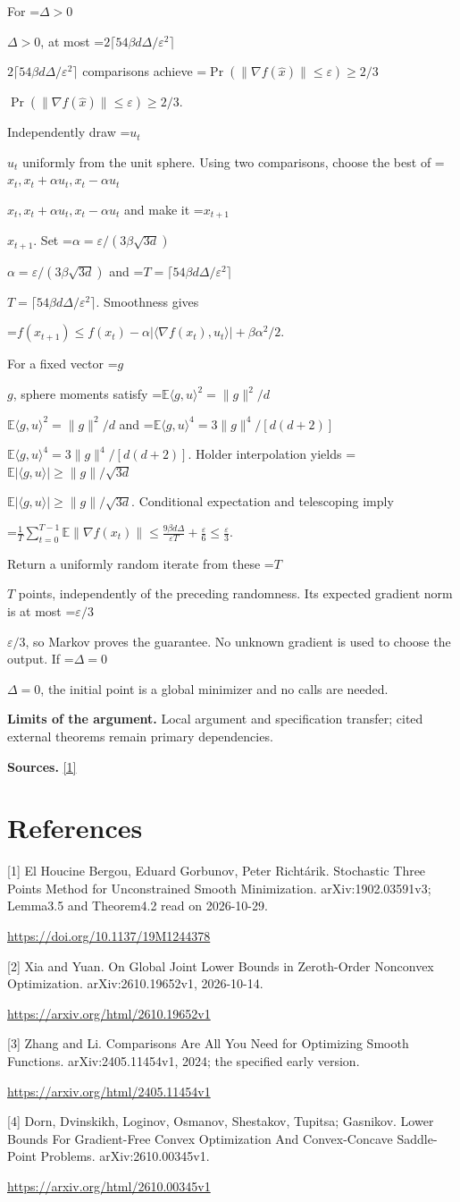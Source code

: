 \documentclass[10pt,a4paper]{article}
\newcommand{\AtlasMath}[1]{\par\begingroup\centering\setbox0=\hbox{$\displaystyle #1$}\ifdim\wd0>1.4\linewidth\typeout{ATLAS WIDE FORMULA: \the\wd0}\fi\ifdim\wd0>\linewidth\resizebox{\linewidth}{!}{\box0}\else\box0\fi\par\endgroup}
\newcommand{\AtlasInlineMath}[1]{\begingroup\setbox0=\hbox{$#1$}\ifdim\wd0>.4\linewidth\endgroup\AtlasMath{#1}\else\endgroup$#1$\fi}
\begin{document}
For \AtlasInlineMath{\Delta>0}, at most \AtlasInlineMath{2\lceil54\beta d\Delta/\varepsilon^2\rceil} comparisons achieve \AtlasInlineMath{\Pr(\|\nabla f(\widehat x)\|\le\varepsilon)\ge2/3}.

Independently draw \AtlasInlineMath{u_t} uniformly from the unit sphere. Using two comparisons, choose the best of \AtlasInlineMath{x_t,x_t+\alpha u_t,x_t-\alpha u_t} and make it \AtlasInlineMath{x_{t+1}}. Set \AtlasInlineMath{\alpha=\varepsilon/(3\beta\sqrt{3d})} and \AtlasInlineMath{T=\lceil54\beta d\Delta/\varepsilon^2\rceil}. Smoothness gives

\AtlasMath{f(x_{t+1})\le f(x_t)-\alpha|\langle\nabla f(x_t),u_t\rangle|+\beta\alpha^2/2.}

For a fixed vector \AtlasInlineMath{g}, sphere moments satisfy \AtlasInlineMath{\mathbb E\langle g,u\rangle^2=\|g\|^2/d} and \AtlasInlineMath{\mathbb E\langle g,u\rangle^4=3\|g\|^4/[d(d+2)]}. Holder interpolation yields \AtlasInlineMath{\mathbb E|\langle g,u\rangle|\ge\|g\|/\sqrt{3d}}. Conditional expectation and telescoping imply

\AtlasMath{\frac1T\sum_{t=0}^{T-1}\mathbb E\|\nabla f(x_t)\|\le\frac{9\beta d\Delta}{\varepsilon T}+\frac\varepsilon6\le\frac\varepsilon3.}

Return a uniformly random iterate from these \AtlasInlineMath{T} points, independently of the preceding randomness. Its expected gradient norm is at most \AtlasInlineMath{\varepsilon/3}, so Markov proves the guarantee. No unknown gradient is used to choose the output. If \AtlasInlineMath{\Delta=0}, the initial point is a global minimizer and no calls are needed.

\textbf{Limits of the argument.} Local argument and specification transfer; cited external theorems remain primary dependencies.

\textbf{Sources.} \href{https://doi.org/10.1137/19M1244378}{[1]}

\section{References}
[1] El Houcine Bergou, Eduard Gorbunov, Peter Richtárik. Stochastic Three Points Method for Unconstrained Smooth Minimization. arXiv:1902.03591v3; Lemma3.5 and Theorem4.2 read on 2026-10-29.

\url{https://doi.org/10.1137/19M1244378}

[2] Xia and Yuan. On Global Joint Lower Bounds in Zeroth-Order Nonconvex Optimization. arXiv:2610.19652v1, 2026-10-14.

\url{https://arxiv.org/html/2610.19652v1}

[3] Zhang and Li. Comparisons Are All You Need for Optimizing Smooth Functions. arXiv:2405.11454v1, 2024; the specified early version.

\url{https://arxiv.org/html/2405.11454v1}

[4] Dorn, Dvinskikh, Loginov, Osmanov, Shestakov, Tupitsa; Gasnikov. Lower Bounds For Gradient-Free Convex Optimization And Convex-Concave Saddle-Point Problems. arXiv:2610.00345v1.

\url{https://arxiv.org/html/2610.00345v1}
\end{document}
